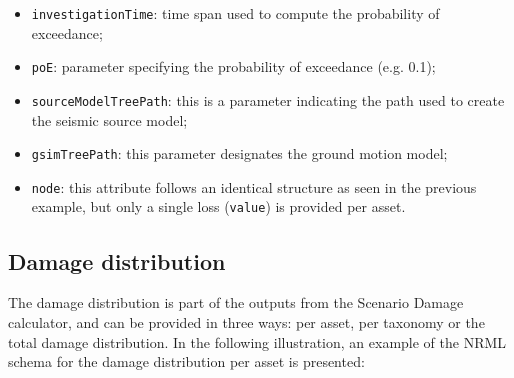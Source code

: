 \begin{itemize}
\item  \Verb+investigationTime+: time span used to compute the probability of exceedance;
\item  \Verb+poE+: parameter specifying the probability of exceedance (e.g. 0.1);
\item  \Verb+sourceModelTreePath+: this is a parameter indicating the path used to create the seismic source model;
\item  \Verb+gsimTreePath+: this parameter designates the ground motion model;
\item  \Verb+node+: this attribute follows an identical structure as seen in the previous example, but only a single loss (\Verb+value+) is provided per \gls{asset}.
\end{itemize}

\subsection{Damage distribution}

The damage distribution is part of the outputs from the Scenario Damage
calculator, and can be provided in three ways: per \gls{asset}, per taxonomy
or the total damage distribution. In the following illustration, an example of
the NRML schema for the damage distribution per \gls{asset} is presented:

